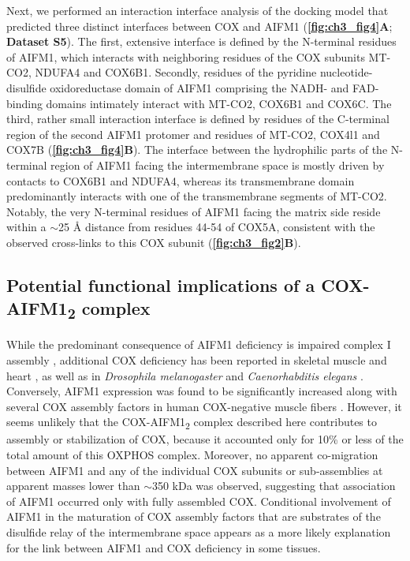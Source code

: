 Next, we performed an interaction interface analysis of the docking model that predicted three distinct interfaces between COX and AIFM1 (\textbf{\autoref{fig:ch3_fig4}A}; \textbf{Dataset S5}). The first, extensive interface is defined by the N-terminal residues of AIFM1, which interacts with neighboring residues of the COX subunits MT-CO2, NDUFA4 and COX6B1. Secondly, residues of the pyridine nucleotide-disulfide oxidoreductase domain of AIF\-M1 comprising the NADH- and FAD-binding domains intimately interact with MT-CO2, COX6B1 and COX6C. The third, rather small interaction interface is defined by residues of the C-terminal region of the second AIFM1 protomer and residues of MT-CO2, COX4l1 and COX7B (\textbf{\autoref{fig:ch3_fig4}B}). The interface between the hydrophilic parts of the N-terminal region of AIFM1 facing the intermembrane space is mostly driven by contacts to COX6B1 and NDUFA4, whereas its transmembrane domain predominantly interacts with one of the transmembrane segments of MT-CO2. Notably, the very N-terminal residues of AIFM1 facing the matrix side reside within a $\sim$25 Å distance from residues 44-54 of COX5A, consistent with the observed cross-links to this COX subunit (\textbf{\autoref{fig:ch3_fig2}B}).
\clearpage
%
\subsection*{Potential functional implications of a COX-AIFM1\textsubscript{2} complex}
While the predominant consequence of AIFM1 deficiency is impaired complex I assembly \cite{RN4}, additional COX deficiency has been reported in skeletal muscle and heart \cite{RN10, RN9}, as well as in \emph{Drosophila melanogaster} \cite{RN48} and \emph{Caenorhabditis elegans} \cite{RN49}. Conversely, AIFM1 expression was found to be significantly increased along with several COX assembly factors in human COX-negative muscle fibers \cite{RN50}. However, it seems unlikely that the COX-AIFM1\textsubscript{2} complex described here contributes to assembly or stabilization of COX, because it accounted only for 10\% or less of the total amount of this OXPHOS complex. Moreover, no apparent co-migration between AIFM1 and any of the individual COX subunits or sub-assemblies at apparent masses lower than $\sim$350 kDa was observed, suggesting that association of AIFM1 occurred only with fully assembled COX. Conditional involvement of AIFM1 in the maturation of COX assembly factors that are substrates of the disulfide relay of the intermembrane space \cite{RN8, RN7, RN6} appears as a more likely explanation for the link between AIFM1 and COX deficiency in some tissues.

